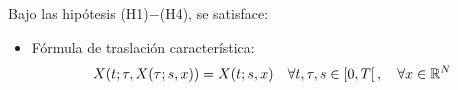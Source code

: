 \begin{teo}\label{teo:t3}
    Bajo las hipótesis (H1)$-$(H4), se satisface:
    \begin{itemize}
        \item[(i)] Fórmula de traslación característica:\label{ftc}
        $$X(t;\tau, X(\tau;s,x)) = X(t;s,x) \quad \forall t, \tau, s \in \left[0, T\right[, \quad \forall x \in \mathbb{R}^N$$

        \begin{figure}[H]
            \begin{center}

                \begin{tikzpicture}[x=0.75pt,y=0.75pt,yscale=-1,xscale=1]


\end{tikzpicture}
\end{center}
\end{figure}
\end{itemize}
\end{teo}
